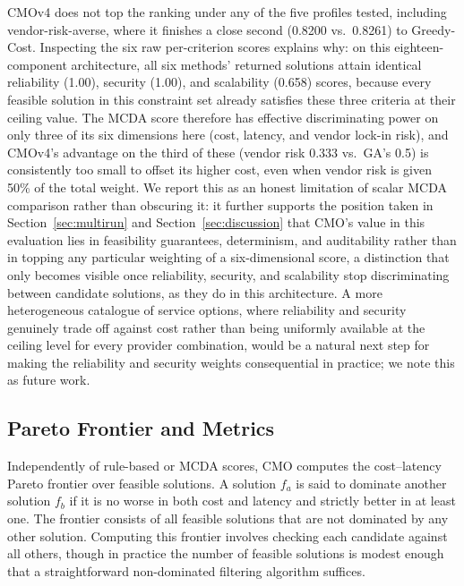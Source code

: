 \documentclass[journal]{IEEEtran}
\newcommand{\cmo}{CMO\xspace}
\newcommand{\cmofour}{CMOv4\xspace}
\begin{document}
\cmofour does not top the ranking under any of the five profiles tested,
including vendor-risk-averse, where it finishes a close second (0.8200 vs.\
0.8261) to Greedy-Cost. Inspecting the six raw per-criterion scores explains
why: on this eighteen-component architecture, all six methods' returned
solutions attain identical reliability (1.00), security (1.00), and
scalability (0.658) scores, because every feasible solution in this
constraint set already satisfies these three criteria at their ceiling value.
The MCDA score therefore has effective discriminating power on only three of
its six dimensions here (cost, latency, and vendor lock-in risk), and
\cmofour's advantage on the third of these (vendor risk 0.333 vs.\ GA's 0.5)
is consistently too small to offset its higher cost, even when vendor risk is
given 50\% of the total weight. We report this as an honest limitation of
scalar MCDA comparison rather than obscuring it: it further supports the
position taken in Section~\ref{sec:multirun} and
Section~\ref{sec:discussion} that \cmo's value in this evaluation lies in
feasibility guarantees, determinism, and auditability rather than in
topping any particular weighting of a six-dimensional score, a distinction
that only becomes visible once reliability, security, and scalability stop
discriminating between candidate solutions, as they do in this architecture.
A more heterogeneous catalogue of service options, where reliability and
security genuinely trade off against cost rather than being uniformly
available at the ceiling level for every provider combination, would be a
natural next step for making the reliability and security weights consequential
in practice; we note this as future work.

\subsection{Pareto Frontier and Metrics}
\label{sec:pareto}

Independently of rule-based or MCDA scores, \cmo computes the cost--latency
Pareto frontier over feasible solutions. A solution $f_a$ is said to dominate
another solution $f_b$ if it is no worse in both cost and latency and strictly
better in at least one. The frontier consists of all feasible solutions that are
not dominated by any other solution. Computing this frontier involves checking
each candidate against all others, though in practice the number of feasible
solutions is modest enough that a straightforward non-dominated filtering
algorithm suffices.
\end{document}
